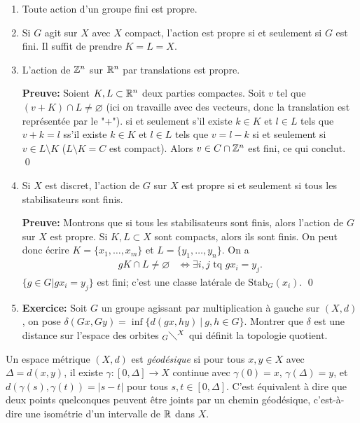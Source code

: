   \begin{exs}
    \begin{enumerate}
    \item Toute action d'un groupe fini est propre.
    \item Si $G$ agit sur $X$ avec $X$ compact, l'action est propre si et seulement si $G$ est fini. Il suffit
      de prendre $K = L = X$.
    \item L'action de $\mathbb{Z}^n$ sur $\mathbb{R}^n$ par translations est propre. 

      \textbf{Preuve:} Soient $K, L \subset \mathbb{R}^n$ deux parties compactes. Soit $v$ tel que $(v + K) \cap L
      \neq \varnothing$ (ici on travaille avec des vecteurs, donc la translation est représentée par le
      "+"). si et seulement s'il existe $k \in K$ et $l\in L$ tels que $v + k = l$ ss'il existe $k \in K$ et
      $l \in L$ tels que $v = l-k$ si et seulement si $v \in L \setminus K$ ($L \setminus K = C$ est
      compact). Alors $v \in C \cap \mathbb{Z}^n$ est fini, ce qui conclut. \qed

    \item Si $X$ est discret, l'action de $G$ sur $X$ est propre si et seulement si tous les stabilisateurs
      sont finis.

      \textbf{Preuve:} Montrons que si tous les stabilisateurs sont finis, alors l'action de $G$ sur $X$ est
      propre. Si $K, L \subset X$ sont compacts, alors ils sont finis. On peut donc écrire $K = \{x_1, \ldots,
      x_m\}$ et $L = \{y_1, \ldots, y_n\}$. On a 
      {
        \begin{align*}
          gK \cap L \neq \varnothing & \iff \exists i,j \text{ tq } gx_i = y_j.
        \end{align*}
      }
      $\{g \in G | gx_i = y_j\}$ est fini; c'est une classe latérale de $\mathrm{Stab}_G(x_i)$. \qed

    \item \textbf{Exercice:} Soit $G$ un groupe agissant par multiplication à gauche sur $(X, d)$, on pose
      $\delta(Gx, Gy) = \inf\{d(gx, hy)\ |\ g, h \in G\}$. Montrer que $\delta$ est une distance sur l'espace
      des orbites $_G \diagdown ^X$ qui définit la topologie quotient.
    \end{enumerate}
  \end{exs}




  \begin{defi} 
    Un espace métrique $(X, d)$ est \emph{géodésique} si pour tous $x, y \in X$ avec $\Delta = d(x,y)$, il
    existe $\gamma:[0, \Delta] \to X$ continue avec $\gamma(0) = x$, $\gamma(\Delta) = y$, et $d(\gamma(s),
    \gamma(t)) = |s-t|$ pour tous $s, t \in [0, \Delta]$. C'est équivalent à dire que deux points quelconques
    peuvent être joints par un chemin géodésique, c'est-à-dire une isométrie d'un intervalle de $\mathbb{R}$ dans $X$.
  \end{defi}


